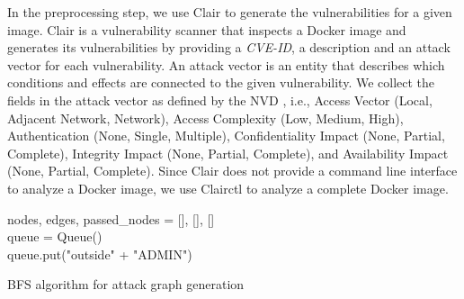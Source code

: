In the preprocessing step, we use Clair to generate the vulnerabilities for a given image. Clair is a vulnerability scanner that inspects a Docker image and generates its vulnerabilities by providing a \textit{CVE-ID}, a description and an attack vector for each vulnerability. An attack vector is an entity that describes which conditions and effects are connected to the given vulnerability. We collect the fields in the attack vector as defined by the NVD \cite{booth2013national}, i.e., Access Vector (Local, Adjacent Network, Network), Access Complexity (Low, Medium, High), Authentication (None, Single, Multiple), Confidentiality Impact (None, Partial, Complete), Integrity Impact (None, Partial, Complete), and Availability Impact (None, Partial, Complete). Since Clair does not provide a command line interface to analyze a Docker image, we use Clairctl to analyze a complete Docker image.

\begin{algorithm}
	\SetAlgoLined
	nodes, edges, passed\_nodes = [], [], [] \\ \label{alg:init_1}
	queue = Queue() \\ \label{alg:init_2}
	queue.put("outside" + "ADMIN") \\ \label{alg:attackNodeInit}
	
	
	\caption{BFS algorithm for attack graph generation}
	\label{BFSalgorithm}
\end{algorithm}

